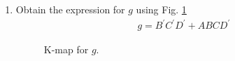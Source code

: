 \begin{enumerate}[label=\thesubsection.\arabic*.,ref=\thesubsection.\theenumi]
%
\item Obtain the expression for $g$ using Fig. \ref{fig:disp_kmap_g}
%
\begin{align}
\label{eq:kmap_disp_g}
g = B^{\prime}C^{\prime}D^{\prime}+ABCD^{\prime}
\end{align}
%
\begin{figure}[!ht]
\centering
\resizebox{\columnwidth}{!} {

}
\caption{K-map for $g$.}
\label{fig:disp_kmap_g}
\end{figure}
\end{enumerate}
%
%
